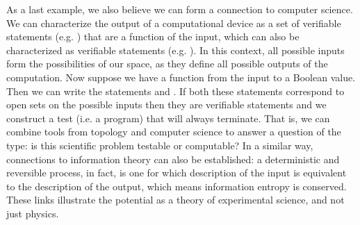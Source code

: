 \documentclass[letterpaper]{article}
\begin{document}
As a last example, we also believe we can form a connection to computer science. We can characterize the output of a computational device as a set of verifiable statements (e.g. ) that are a function of the input, which can also be characterized as verifiable statements (e.g. ). In this context, all possible inputs form the possibilities of our space, as they define all possible outputs of the computation. Now suppose we have a function from the input to a Boolean value. Then we can write the statements  and . If both these statements correspond to open sets on the possible inputs then they are verifiable statements and we construct a test (i.e. a program) that will always terminate. That is, we can combine tools from topology and computer science to answer a question of the type: is this scientific problem testable or computable? In a similar way, connections to information theory can also be established: a deterministic and reversible process, in fact, is one for which description of the input is equivalent to the description of the output, which means information entropy is conserved. These links illustrate the potential as a theory of experimental science, and not just physics.
\end{document}
